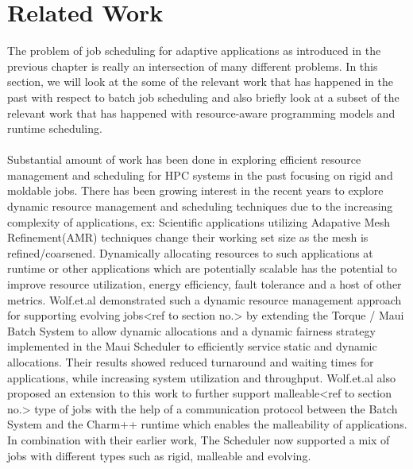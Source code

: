 \chapter{Related Work}\label{chapter:related work}
The problem of job scheduling for adaptive applications as introduced in the previous chapter is really an intersection of many different problems. In this section, we will look at the some of the relevant work that has happened in the past with respect to batch job scheduling and also briefly look at a subset of the relevant work that has happened with resource-aware programming models and runtime scheduling.\\ \\
Substantial amount of work has been done in exploring efficient resource management and scheduling for HPC systems in the past focusing on rigid and moldable jobs. There has been growing interest in the recent years to explore dynamic resource management and scheduling techniques due to the increasing complexity of applications, ex: Scientific applications utilizing Adapative Mesh Refinement(AMR) techniques change their working set size as the mesh is refined/coarsened. Dynamically allocating resources to such applications at runtime or other applications which are potentially scalable has the potential to improve resource utilization, energy efficiency, fault tolerance and a host of other metrics\cite{abhishek}\cite{osman}. Wolf.et.al\cite{felix} demonstrated such a dynamic resource management approach for supporting evolving jobs<ref to section no.> by extending the Torque / Maui Batch System to allow dynamic allocations and a dynamic fairness strategy implemented in the Maui Scheduler to efficiently service static and dynamic allocations. Their results showed reduced turnaround and waiting times for applications, while increasing system utilization and throughput. Wolf.et.al\cite{laxmikant} also proposed an extension to this work to further support malleable<ref to section no.> type of jobs with the help of a communication protocol between the Batch System and the Charm++ runtime which enables the malleability of applications. In combination with their earlier work, The Scheduler now supported a mix of jobs with different types such as rigid, malleable and evolving.\\ \\
